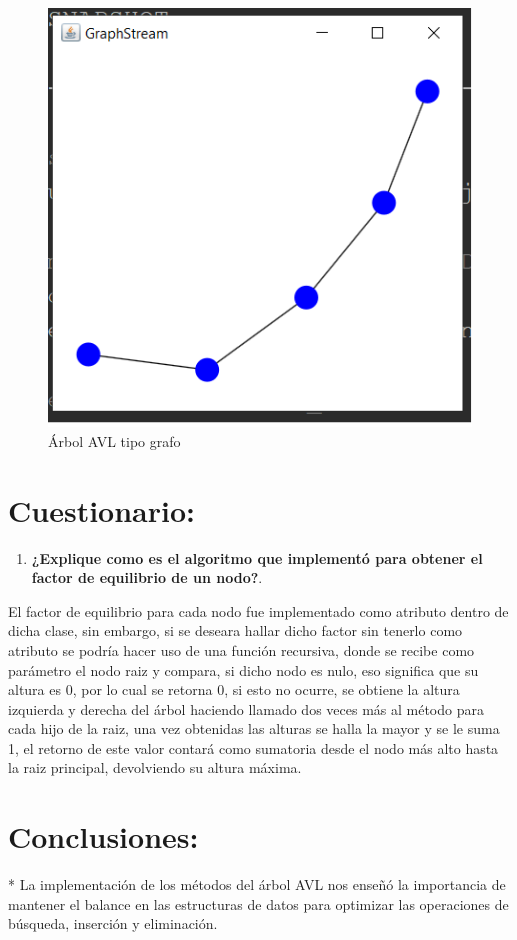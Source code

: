 \documentclass{article}
\begin{document}
    \begin{figure}[H]
        \centering
        \includegraphics[scale=0.5]{img/graph.png}
        \caption{Árbol AVL tipo grafo}
        \label{fig:imagen}
    \end{figure}

\section{Cuestionario:}
    \begin{enumerate}
        \item \textbf{¿Explique como es el algoritmo que implementó para obtener el factor de equilibrio de un nodo?}.
    \end{enumerate}
El factor de equilibrio para cada nodo fue implementado como atributo dentro de dicha clase, sin embargo, si se deseara hallar dicho factor sin tenerlo como atributo se podría hacer uso de una función recursiva, donde se recibe como parámetro el nodo raiz y compara, si dicho nodo es nulo, eso significa que su altura es 0, por lo cual se retorna 0, si esto no ocurre, se obtiene la altura izquierda y derecha del árbol haciendo llamado dos veces más al método para cada hijo de la raiz, una vez obtenidas las alturas se halla la mayor y se le suma 1, el retorno de este valor contará como sumatoria desde el nodo más alto hasta la raiz principal, devolviendo su altura máxima.

\section{Conclusiones:}
* La implementación de los métodos del árbol AVL nos enseñó la importancia de mantener el balance en las estructuras de datos para optimizar las operaciones de búsqueda, inserción y eliminación.
\end{document}
